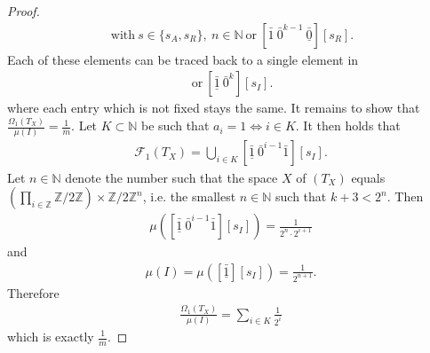 \documentclass[12pt,a4paper]{scrartcl}
\numberwithin{equation}{section}
\newcommand{\Z}{\mathbb{Z}} %
\newcommand{\N}{\mathbb{N}} %
\newcommand{\2}{\mathbb{Z} / 2 \mathbb{Z}}
\newcommand{\1}{\bar{1}}
\newcommand{\0}{\bar{0}}
\begin{document}
\begin{proof}
	\begin{align*}
		[\1 \ \0^n \ \underline{\1}][s] \ \text{with} \ s \in \{s_A, s_R\}, \ n \in \N \ \text{or} \ [\1 \ \0^{k-1} \ \underline{\0}][s_R].
	\end{align*} 
	Each of these elements can be traced back to a single element in
	\begin{align*}
	[\underline{\1} \ \0^{n} \ \1][s_I] \ \text{or} \ [\underline{\1}  \ \0^{k}][s_I].
	\end{align*} 
	where each entry which is not fixed stays the same. 
	It remains to show that $\frac{\Omega_1(T_X)}{\mu(I)} = \frac{1}{m}$. Let $K \subset \N$ be such that $a_i = 1 \Leftrightarrow i \in K$. It then holds that
	\begin{align*}
		\mathcal{F}_1(T_X) = \bigcup_{i \in K}[\underline{\1} \ \0^{i-1} \1][s_I].
	\end{align*}
	Let $n \in \N$ denote the number such that the space $X$ of $(T_X)$ equals $(\prod_{i \in \Z} \2) \times \2^n$, i.e. the smallest $n \in \N$ such that $k+3 < 2^n$. Then 
	\begin{align*}
		\mu([\underline{\1} \ \0^{i-1} \1][s_I]) = \frac{1}{2^n \cdot 2^ {i + 1}}
	\end{align*}
	and
	\begin{align*}
		\mu(I) = \mu([\underline{\1}][s_I]) = \frac{1}{2^{n + 1}}.
	\end{align*}
	Therefore 
	\begin{align*}
		\frac{\Omega_1(T_X)}{\mu(I)} = \sum_{i \in K} \frac{1}{2^i}
	\end{align*}
	which is exactly $\frac{1}{m}$.
\end{proof}
\end{document}
